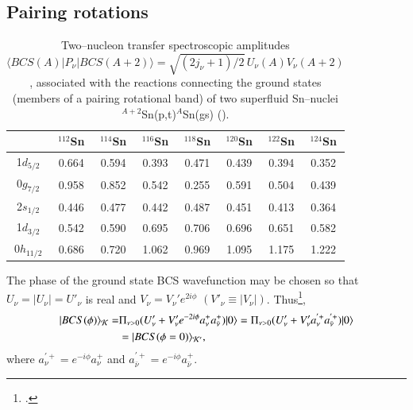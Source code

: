 \subsection{Pairing rotations}

\begin{table}[h!]
{\begin{tabular}{|c|c|c|c|c|c|c|c|}
\cline{1-8} 
& $^{112}$Sn & $^{114}$Sn&  $^{116}$Sn & $^{118}$Sn&  $^{120}$Sn &  $^{122}$Sn &  $^{124}$Sn          \\
\hline
1$d_{5/2}$            & 0.664      &  0.594   & 0.393    & 0.471      & 0.439     &  0.394    &  0.352                  \\
\hline 
0$g_{7/2}$            &  0.958     &  0.852  &  0.542     &  0.255   &  0.591      &  0.504  &   0.439                 \\
\hline 
2$s_{1/2}$            &  0.446    & 0.477    &  0.442    &  0.487     &  0.451   &  0.413     & 0.364                   \\
\hline 
1$d_{3/2}$            &  0.542    & 0.590   &  0.695    &  0.706     &  0.696   & 0.651   &   0.582                 \\
\hline 
0$h_{11/2}$            & 0.686     & 0.720    &  1.062     &  0.969     &  1.095   &  1.175    &   1.222                 \\
\hline 
\end{tabular}}
\caption{Two--nucleon transfer spectroscopic amplitudes \mbox{$\langle BCS(A)|P_{\nu}|BCS(A+2)\rangle=\sqrt{(2j_{\nu}+1)/2}\,U_{\nu}(A)V_{\nu}(A+2)$}, associated with the  reactions connecting the ground states (members of a pairing rotational band) of two superfluid Sn--nuclei $^{A+2}$Sn(p,t)$^A$Sn(gs) (\cite{Potel:13}).}\label{tab8_2_1}
\end{table}
The phase of the ground state BCS wavefunction may be chosen so that $U_{\nu} = |U_{\nu}| = U'_{\nu}$
is real and $V_{\nu} = V_{\nu}' e^{2 i \phi}$ $(V'_{\nu} \equiv |V_{\nu}|)$. Thus\footnote{\cite{Schrieffer:73}.},
\begin{align}
\nonumber |BCS(\phi)\rangle_{\cal K}  =& \Pi_{\nu>0} (U'_{\nu} + V'_{\nu} e^{-2 i \phi} a^+_{\nu} a^+_{\bar \nu}) |0\rangle = 
\Pi_{\nu>0} (U'_{\nu} + V'_{\nu} a^{'+}_{\nu} a^{'+}_{\bar \nu}) |0\rangle  \\
&=|BCS(\phi =0)\rangle_{\cal K'},
\label{mean}
\end{align}
where $a^{'+}_{\nu} = e^{-i \phi}a^+_{\nu}$ and   $a^{'+}_{\bar \nu} = e^{-i \phi}a^+_{\bar \nu}$.
